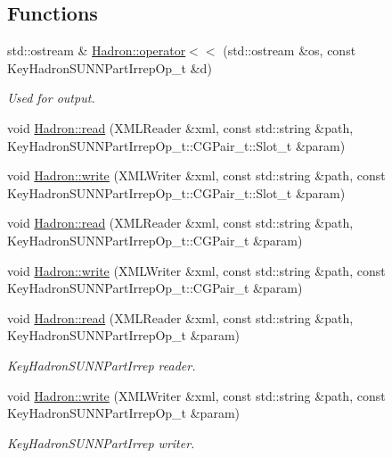 \subsection*{Functions}
\begin{DoxyCompactItemize}
\item 
std\+::ostream \& \mbox{\hyperlink{namespaceHadron_a4347887ac461374a85fd726b7dece87c}{Hadron\+::operator$<$$<$}} (std\+::ostream \&os, const Key\+Hadron\+S\+U\+N\+N\+Part\+Irrep\+Op\+\_\+t \&d)
\begin{DoxyCompactList}\small\item\em Used for output. \end{DoxyCompactList}\item 
void \mbox{\hyperlink{namespaceHadron_a73f1c84ecf25af9f0187691f514b5570}{Hadron\+::read}} (X\+M\+L\+Reader \&xml, const std\+::string \&path, Key\+Hadron\+S\+U\+N\+N\+Part\+Irrep\+Op\+\_\+t\+::\+C\+G\+Pair\+\_\+t\+::\+Slot\+\_\+t \&param)
\item 
void \mbox{\hyperlink{namespaceHadron_aeeb688cdcca0a8494272d68cf2f15481}{Hadron\+::write}} (X\+M\+L\+Writer \&xml, const std\+::string \&path, const Key\+Hadron\+S\+U\+N\+N\+Part\+Irrep\+Op\+\_\+t\+::\+C\+G\+Pair\+\_\+t\+::\+Slot\+\_\+t \&param)
\item 
void \mbox{\hyperlink{namespaceHadron_adc5eb75838fc176e1641d6264c9a894d}{Hadron\+::read}} (X\+M\+L\+Reader \&xml, const std\+::string \&path, Key\+Hadron\+S\+U\+N\+N\+Part\+Irrep\+Op\+\_\+t\+::\+C\+G\+Pair\+\_\+t \&param)
\item 
void \mbox{\hyperlink{namespaceHadron_a835e4515b6f5e491ce57ac5169196d90}{Hadron\+::write}} (X\+M\+L\+Writer \&xml, const std\+::string \&path, const Key\+Hadron\+S\+U\+N\+N\+Part\+Irrep\+Op\+\_\+t\+::\+C\+G\+Pair\+\_\+t \&param)
\item 
void \mbox{\hyperlink{namespaceHadron_a6ee3d9a9ffb4f6e626fa1a73b49c9ee0}{Hadron\+::read}} (X\+M\+L\+Reader \&xml, const std\+::string \&path, Key\+Hadron\+S\+U\+N\+N\+Part\+Irrep\+Op\+\_\+t \&param)
\begin{DoxyCompactList}\small\item\em Key\+Hadron\+S\+U\+N\+N\+Part\+Irrep reader. \end{DoxyCompactList}\item 
void \mbox{\hyperlink{namespaceHadron_a04a5b512d84ea116e0714765e22cbc30}{Hadron\+::write}} (X\+M\+L\+Writer \&xml, const std\+::string \&path, const Key\+Hadron\+S\+U\+N\+N\+Part\+Irrep\+Op\+\_\+t \&param)
\begin{DoxyCompactList}\small\item\em Key\+Hadron\+S\+U\+N\+N\+Part\+Irrep writer. \end{DoxyCompactList}\item 

\end{DoxyCompactItemize}
